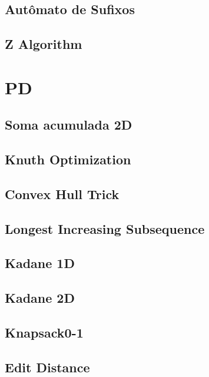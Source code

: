 \subsection{Autômato de Sufixos}
\raggedbottom
\hrulefill
\subsection{Z Algorithm}
\raggedbottom
\hrulefill

\section{PD}
\subsection{Soma acumulada 2D}
\raggedbottom
\hrulefill
\subsection{Knuth Optimization}
\raggedbottom
\hrulefill
\subsection{Convex Hull Trick}
\raggedbottom
\hrulefill
\subsection{Longest Increasing Subsequence}
\raggedbottom
\hrulefill
\subsection{Kadane 1D}
\raggedbottom
\hrulefill
\subsection{Kadane 2D}
\raggedbottom
\hrulefill
\subsection{Knapsack0-1}
\raggedbottom
\hrulefill
\subsection{Edit Distance}
\raggedbottom
\hrulefill

